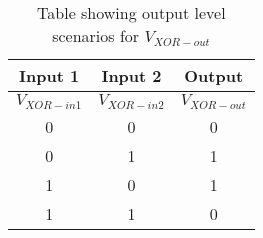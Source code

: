 \begin{table}[H]
\centering
\begin{tabular}{|c|c|c|}
\hline
Input 1   & Input 2   & Output       \\ \hline
$V_{XOR-in1}$ & $V_{XOR-in2}$ & $V_{XOR-out}$ \\ \hline
0         & 0         & 0            \\ \hline
0         & 1         & 1            \\ \hline
1         & 0         & 1            \\ \hline
1         & 1         & 0            \\ \hline
\end{tabular}
\caption{Table showing output level scenarios for $V_{XOR-out}$}
\label{XOR_table}
\end{table}

